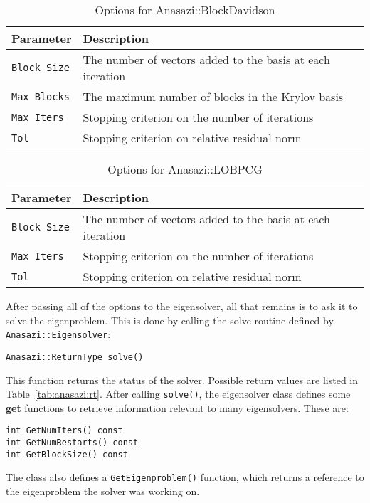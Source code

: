\begin{table}
\begin{center}
\begin{tabular}{| p{4cm} l |}
\hline
Parameter & Description \\
\hline
{\tt Block Size} & The number of vectors added to the basis at each iteration \\
{\tt Max Blocks} & The maximum number of blocks in the Krylov basis \\
{\tt Max Iters}  & Stopping criterion on the number of iterations \\
{\tt Tol}        & Stopping criterion on relative residual norm \\
\hline
\end{tabular}
\caption{Options for Anasazi::BlockDavidson}
\label{tab:anasazi:bd_params}
\end{center}
\end{table}

\begin{table}
\begin{center}
\begin{tabular}{| p{4cm} l |}
\hline
Parameter & Description \\
\hline
{\tt Block Size} & The number of vectors added to the basis at each iteration \\
{\tt Max Iters}  & Stopping criterion on the number of iterations \\
{\tt Tol}        & Stopping criterion on relative residual norm \\
\hline
\end{tabular}
\caption{Options for Anasazi::LOBPCG}
\label{tab:anasazi:lobpcg_params}
\end{center}
\end{table}

After passing all of the options to the eigensolver, all that remains is to ask
it to solve the eigenproblem. This is done by calling the solve routine 
defined by \verb!Anasazi::Eigensolver!:
\begin{verbatim}
Anasazi::ReturnType solve()
\end{verbatim}
This function returns the status of the solver. Possible return values are
listed in Table~\ref{tab:anasazi:rt}. After calling \verb!solve()!, the
eigensolver class defines some \textbf{get} functions to retrieve information
relevant to many eigensolvers. These are:
\begin{verbatim}
int GetNumIters() const
int GetNumRestarts() const
int GetBlockSize() const 
\end{verbatim}
The class also defines a \verb!GetEigenproblem()! function, which returns a
reference to the eigenproblem the solver was working on.

